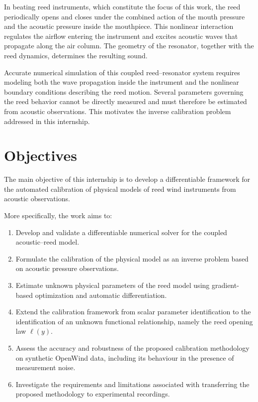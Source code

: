 \documentclass[11pt,a4paper]{report}
\theoremstyle{plain}
\theoremstyle{definition}
\begin{document}
In beating reed instruments, which constitute the focus of this work, the reed periodically opens and closes under the combined action of 
the mouth pressure and the acoustic pressure inside the mouthpiece. This nonlinear interaction regulates the airflow entering the instrument 
and excites acoustic waves that propagate along the air column. The geometry of the resonator, together with the reed dynamics, determines 
the resulting sound.

Accurate numerical simulation of this coupled reed--resonator system requires modeling both the wave propagation inside the instrument and 
the nonlinear boundary conditions describing the reed motion. Several parameters governing the reed behavior cannot be directly measured 
and must therefore be estimated from acoustic observations. This motivates the inverse calibration problem addressed in this internship.

\section*{Objectives}

The main objective of this internship is to develop a differentiable
framework for the automated calibration of physical models of reed wind
instruments from acoustic observations.

More specifically, the work aims to:

\begin{enumerate}
    \item Develop and validate a differentiable numerical solver for the
    coupled acoustic--reed model.

    \item Formulate the calibration of the physical model as an inverse
    problem based on acoustic pressure observations.

    \item Estimate unknown physical parameters of the reed model using
    gradient-based optimization and automatic differentiation.

    \item Extend the calibration framework from scalar parameter
    identification to the identification of an unknown functional
    relationship, namely the reed opening law $\ell(y)$.

    \item Assess the accuracy and robustness of the proposed calibration
    methodology on synthetic OpenWind data, including its behaviour in
    the presence of measurement noise.

    \item Investigate the requirements and limitations associated with
    transferring the proposed methodology to experimental recordings.
\end{enumerate}
\end{document}
